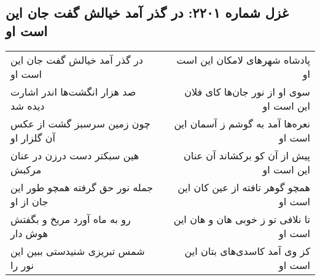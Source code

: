 \begin{center}
\section*{غزل شماره ۲۲۰۱: در گذر آمد خیالش گفت جان این است او}
\label{sec:2201}
\begin{longtable}{l p{0.5cm} r}
در گذر آمد خیالش گفت جان این است او
&&
پادشاه شهرهای لامکان این است او
\\
صد هزار انگشت‌ها اندر اشارت دیده شد
&&
سوی او از نور جان‌ها کای فلان این است او
\\
چون زمین سرسبز گشت از عکس آن گلزار او
&&
نعره‌ها آمد به گوشم ز آسمان این است او
\\
هین سبکتر دست درزن در عنان مرکبش
&&
پیش از آن کو برکشاند آن عنان این است او
\\
جمله نور حق گرفته همچو طور این جان از او
&&
همچو گوهر تافته از عین کان این است او
\\
رو به ماه آورد مریخ و بگفتش هوش دار
&&
تا نلافی تو ز خوبی هان و هان این است او
\\
شمس تبریزی شنیدستی ببین این نور را
&&
کز وی آمد کاسدی‌های بتان این است او
\\
\end{longtable}
\end{center}
